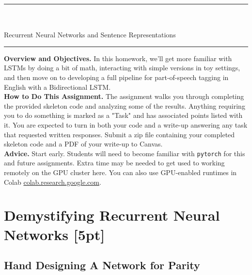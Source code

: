 \documentclass[a4paper,10pt]{article}
\begin{document}

\sffamily

\begin{center}
\noindent\rule{\textwidth}{1pt}\\[10pt]
{\color{blue!60}{AI539 Natural Language Processing with Deep Learning -- Homework 2}}\\[10pt]
{\LARGE Recurrent Neural Networks and Sentence Representations}\\[10pt]
\noindent\rule{\textwidth}{1pt}
\end{center}

\noindent\textbf{Overview and Objectives.} In this homework, we'll get more familiar with LSTMs by doing a bit of math, interacting with simple versions in toy settings, and then move on to developing a full pipeline for part-of-speech tagging in English with a Bidirectional LSTM.\\

\noindent\textbf{How to Do This Assignment.} The assignment walks you through completing the provided skeleton code and analyzing some of the results. Anything requiring you to do something is marked as a "Task" and has associated points listed with it. You are expected to turn in both your code and a write-up answering any task that requested written responses. Submit a zip file containing your completed skeleton code and a PDF of your write-up to Canvas.\\ 

\noindent\textbf{Advice.} Start early. Students will need to become familiar with \texttt{pytorch} for this and future assignments. Extra time may be needed to get used to working remotely on the GPU cluster here. You can also use GPU-enabled runtimes in Colab \url{colab.research.google.com}.

\section{Demystifying Recurrent Neural Networks [5pt]}

\subsection{Hand Designing A Network for Parity}
\end{document}

